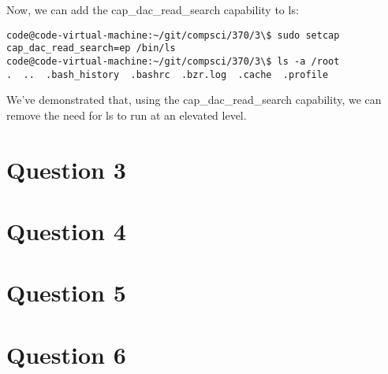 \documentclass[10pt,letterpaper]{article}
\begin{document}
Now, we can add the cap\_dac\_read\_search capability to ls:
\begin{lstlisting}
code@code-virtual-machine:~/git/compsci/370/3\$ sudo setcap cap_dac_read_search=ep /bin/ls
code@code-virtual-machine:~/git/compsci/370/3\$ ls -a /root
.  ..  .bash_history  .bashrc  .bzr.log  .cache  .profile
\end{lstlisting}

We've demonstrated that, using the cap\_dac\_read\_search capability, we can remove
the need for ls to run at an elevated level.

\section*{Question 3}

\section*{Question 4}
\section*{Question 5}
\section*{Question 6}
\end{document}
